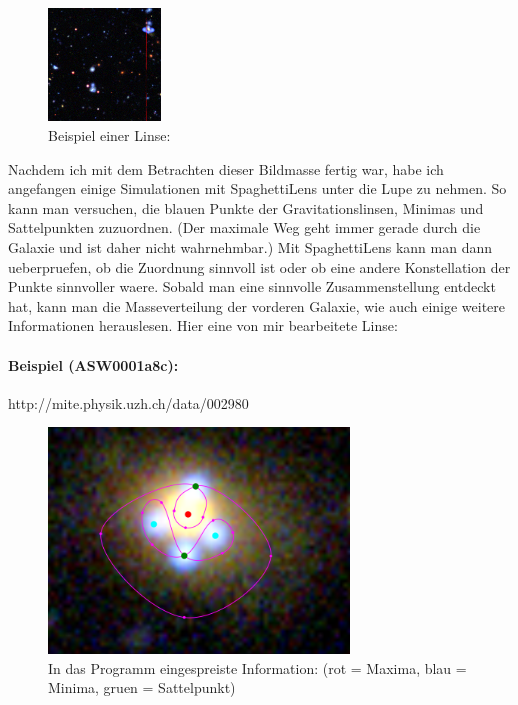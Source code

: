 \documentclass[pdftex,12pt,a4paper]{article}
\begin{document}
\begin{figure}[position=h]
\centering
 \caption{Beispiel einer Linse:}
 \includegraphics[trim = 128mm 116mm 8mm 14mm, clip, width=3cm]{Bilder/lol}%
\end{figure}
\newpage Nachdem ich mit dem Betrachten dieser Bildmasse fertig war, habe ich angefangen einige Simulationen mit SpaghettiLens unter die Lupe zu nehmen.
So kann man versuchen, die blauen Punkte der Gravitationslinsen, Minimas und Sattelpunkten zuzuordnen.
(Der maximale Weg geht immer gerade durch die Galaxie und ist daher nicht wahrnehmbar.)
Mit SpaghettiLens kann man dann ueberpruefen, ob die Zuordnung sinnvoll ist oder ob eine andere Konstellation der Punkte sinnvoller waere.
Sobald man eine sinnvolle Zusammenstellung entdeckt hat, kann man die Masseverteilung der vorderen Galaxie, wie auch einige weitere Informationen herauslesen.
Hier eine von mir bearbeitete Linse:


\paragraph{Beispiel (ASW0001a8c):}
http://mite.physik.uzh.ch/data/002980

\begin{figure}[position=h]
\centering
 \caption{In das Programm eingespreiste Information:\newline
  (rot = Maxima, blau = Minima, gruen = Sattelpunkt)}
 \includegraphics[trim = 40mm 50mm 60mm 40mm, clip, width=8cm]{Bilder/workinput}%
\end{figure}
\end{document}
